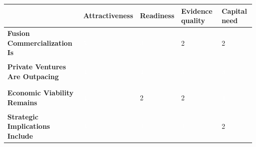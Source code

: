 \documentclass[10pt,a4paper]{article}
\begin{document}
{\scriptsize\begin{tabular}{p{38mm}>{\centering\arraybackslash}p{21mm}>{\centering\arraybackslash}p{21mm}>{\centering\arraybackslash}p{21mm}>{\centering\arraybackslash}p{21mm}}
 & {\bfseries Attractiveness} & {\bfseries Readiness} & {\bfseries Evidence quality} & {\bfseries Capital need} \\
\hline
{\bfseries Fusion Commercialization Is} & \colorbox{BOGreen}{\textcolor{white}{\strut\hspace{5pt}5\hspace{5pt}}} & \colorbox{BOBlue}{\textcolor{white}{\strut\hspace{5pt}3\hspace{5pt}}} & \colorbox{BOLight}{\textcolor{BOText}{\strut\hspace{5pt}2\hspace{5pt}}} & \colorbox{BOLight}{\textcolor{BOText}{\strut\hspace{5pt}2\hspace{5pt}}} \\
{\bfseries Private Ventures Are Outpacing} & \colorbox{BOGreen}{\textcolor{white}{\strut\hspace{5pt}4\hspace{5pt}}} & \colorbox{BOGreen}{\textcolor{white}{\strut\hspace{5pt}4\hspace{5pt}}} & \colorbox{BOBlue}{\textcolor{white}{\strut\hspace{5pt}3\hspace{5pt}}} & \colorbox{BOBlue}{\textcolor{white}{\strut\hspace{5pt}3\hspace{5pt}}} \\
{\bfseries Economic Viability Remains} & \colorbox{BOGreen}{\textcolor{white}{\strut\hspace{5pt}4\hspace{5pt}}} & \colorbox{BOLight}{\textcolor{BOText}{\strut\hspace{5pt}2\hspace{5pt}}} & \colorbox{BOLight}{\textcolor{BOText}{\strut\hspace{5pt}2\hspace{5pt}}} & \colorbox{BOGreen}{\textcolor{white}{\strut\hspace{5pt}4\hspace{5pt}}} \\
{\bfseries Strategic Implications Include} & \colorbox{BOBlue}{\textcolor{white}{\strut\hspace{5pt}3\hspace{5pt}}} & \colorbox{BOBlue}{\textcolor{white}{\strut\hspace{5pt}3\hspace{5pt}}} & \colorbox{BOBlue}{\textcolor{white}{\strut\hspace{5pt}3\hspace{5pt}}} & \colorbox{BOLight}{\textcolor{BOText}{\strut\hspace{5pt}2\hspace{5pt}}} \\

\end{tabular}}
\end{document}
